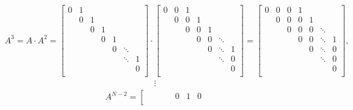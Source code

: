 \documentclass[letterpaper,10pt,english]{jupyterBook}
\begin{document}
\begin{equation*}
\begin{split}
    A^3 = A \cdot A^2 = \left[ {\begin{array}{ccccccc}
    0 & 1 &  &  &  &  & \\
     & 0 & 1 &  &  &  &\\
     &  & 0 & 1 &  &  &\\
     &  &  & 0 & 1 &  &\\
     &  &  &  & 0 & \ddots &  \\
     &  &  &  &  & \ddots & 1 \\
     &  &  &  &  &  & 0 \\
\end{array} } \right] \cdot \left[ {\begin{array}{ccccccc}
    0 & 0 & 1 &  &  &  & \\
     & 0 & 0 & 1 &  &  &\\
     &  & 0 & 0 & 1 &  &\\
     &  &  & 0 & 0 & \ddots &\\
     &  &  &  & 0 & \ddots & 1 \\
     &  &  &  &  & \ddots & 0 \\
     &  &  &  &  &  & 0 \\
\end{array} } \right] = \left[ {\begin{array}{ccccccc}
    0 & 0 & 0 & 1 &  &  & \\
     & 0 & 0 & 0 & 1 &  &\\
     &  & 0 & 0 & 0 & \ddots &\\
     &  &  & 0 & 0 & \ddots & 1\\
     &  &  &  & 0 & \ddots & 0 \\
     &  &  &  &  & \ddots & 0 \\
     &  &  &  &  &  & 0 \\
\end{array} } \right],
\end{split}
\end{equation*}\begin{equation*}
\begin{split}
    \vdots
\end{split}
\end{equation*}\begin{equation*}
\begin{split}
    A^{N-2} = \left[ {\begin{array}{ccccccc}
     &  &  &  & 0 & 1 & 0\\

\end{array}}
\end{split}
\end{equation*}
\end{document}
